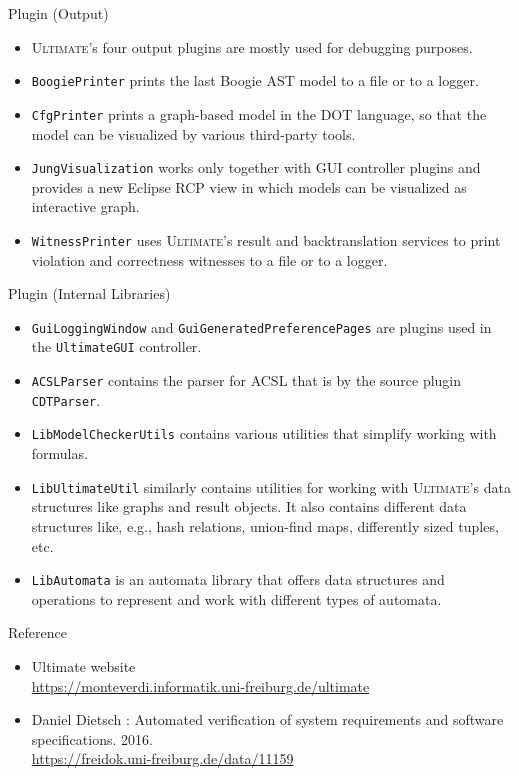 \documentclass[12pt]{beamer}
\newcommand{\code}[1]{\texttt{#1}}
\newcommand{\ultimates}{\textsc{Ultimate}'s }
\newcommand{\ultimateURL}{\url{https://monteverdi.informatik.uni-freiburg.de/ultimate}}
\begin{document}
\begin{frame}{Plugin (Output)}
	\begin{itemize}
		\item \ultimates four output plugins are mostly used for debugging purposes.
		\item \code{BoogiePrinter} prints the last Boogie AST model to a file or to a logger.
		\item \code{CfgPrinter} prints a graph-based model in the DOT language, so that the model can be visualized by various third-party tools.
		\item \code{JungVisualization} works only together with GUI controller plugins and provides a new Eclipse RCP view in which models can be visualized as interactive graph. 
		\item \code{WitnessPrinter} uses \ultimates result and backtranslation services to print violation and correctness witnesses to a file or to a logger.
	\end{itemize}
\end{frame}

\begin{frame}{Plugin (Internal Libraries)}
	\begin{itemize}
		\item \code{GuiLoggingWindow} and \code{GuiGeneratedPreferencePages} are plugins used in the \code{UltimateGUI} controller.
		\item \code{ACSLParser} contains the parser for ACSL that is by the source plugin \code{CDTParser}.
		\item \code{LibModelCheckerUtils} contains various utilities that simplify working with formulas.
		\item \code{LibUltimateUtil} similarly contains utilities for working with \ultimates data structures like graphs and result objects. It also contains different data structures like, e.g., hash relations, union-find maps, differently sized tuples, etc.
		\item \code{LibAutomata} is an automata library that offers data structures and operations to represent and work with different types of automata.
	\end{itemize}
\end{frame}

\begin{frame}{Reference}
	\begin{itemize}
		\item Ultimate website\\
		\ultimateURL
		\item Daniel Dietsch : Automated verification of system requirements and software specifications. 2016.\\
		\url{https://freidok.uni-freiburg.de/data/11159}
	\end{itemize}
\end{frame}
\end{document}
